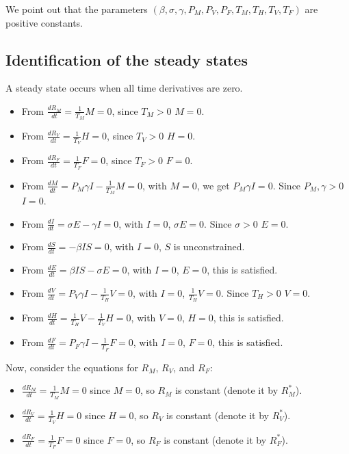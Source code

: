 \documentclass[11pt]{article}
\begin{document}
We point out that the parameters $(\beta, \sigma, \gamma, P_M, P_V, P_F, T_M, T_H, T_V, T_F)$ are positive constants.

\subsection{Identification of the steady states}

A steady state occurs when all time derivatives are zero.

\begin{itemize}
    \item From \(\frac{dR_M}{dt} = \frac{1}{T_M} M = 0\), since \(T_M > 0\) \Rightarrow \(M = 0\).
    \item From \(\frac{dR_V}{dt} = \frac{1}{T_V} H = 0\), since \(T_V > 0\) \Rightarrow \(H = 0\).
    \item From \(\frac{dR_F}{dt} = \frac{1}{T_F} F = 0\), since \(T_F > 0\) \Rightarrow \(F = 0\).
    \item From \(\frac{dM}{dt} = P_M \gamma I - \frac{1}{T_M} M = 0\), with \(M = 0\), we get \(P_M \gamma I = 0\). Since \(P_M, \gamma > 0\) \Rightarrow \(I = 0\).
    \item From \(\frac{dI}{dt} = \sigma E - \gamma I = 0\), with \(I = 0\), \(\sigma E = 0\). Since \(\sigma > 0\) \Rightarrow \(E = 0\).
    \item From \(\frac{dS}{dt} = -\beta I S = 0\), with \(I = 0\), \(S\) is unconstrained.
    \item From \(\frac{dE}{dt} = \beta I S - \sigma E = 0\), with \(I = 0\), \(E = 0\), this is satisfied.
    \item From \(\frac{dV}{dt} = P_V \gamma I - \frac{1}{T_H} V = 0\), with \(I = 0\), \(\frac{1}{T_H} V = 0\). Since \(T_H > 0\) \Rightarrow \(V = 0\).
    \item From \(\frac{dH}{dt} = \frac{1}{T_H} V - \frac{1}{T_V} H = 0\), with \(V = 0\), \(H = 0\), this is satisfied.
    \item From \(\frac{dF}{dt} = P_F \gamma I - \frac{1}{T_F} F = 0\), with \(I = 0\), \(F = 0\), this is satisfied.
\end{itemize}

Now, consider the equations for $R_M$, $R_V$, and $R_F$:

\begin{itemize}
\item $\frac{dR_M}{dt} = \frac{1}{T_M} M = 0$ since $M = 0$, so $R_M$ is constant (denote it by $R_M^*$).
\item $\frac{dR_V}{dt} = \frac{1}{T_V} H = 0$ since $H = 0$, so $R_V$ is constant (denote it by $R_V^*$).
\item $\frac{dR_F}{dt} = \frac{1}{T_F} F = 0$ since $F = 0$, so $R_F$ is constant (denote it by $R_F^*$).
\end{itemize}
\end{document}
